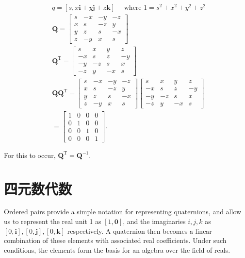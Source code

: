 $$
\begin{aligned}
& q=[s, x \mathbf{i}+y \mathbf{j}+z \mathbf{k}] \quad \text { where } 1=s^{2}+x^{2}+y^{2}+z^{2} \\
& \mathbf{Q}=\left[\begin{array}{cccc}s & -x & -y & -z \\x & s & -z & y \\y & z & s & -x \\z & -y & x & s\end{array}\right] \\
& \mathbf{Q}^{\mathrm{T}}=\left[\begin{array}{cccc}s & x & y & z \\-x & s & z & -y \\-y & -z & s & x \\-z & y & -x & s\end{array}\right] \\
& \mathbf{Q} \mathbf{Q}^{\mathrm{T}}=\left[\begin{array}{cccc}s & -x & -y & -z \\x & s & -z & y \\y & z & s & -x \\z & -y & x & s\end{array}\right]\left[\begin{array}{cccc}s & x & y & z \\-x & s & z & -y \\-y & -z & s & x \\-z & y & -x & s\end{array}\right] \\
& =\left[\begin{array}{llll}1 & 0 & 0 & 0 \\0 & 1 & 0 & 0 \\0 & 0 & 1 & 0 \\0 & 0 & 0 & 1\end{array}\right] \text {. }
\end{aligned}
$$

For this to occur, $\mathbf{Q}^{\mathrm{T}}=\mathbf{Q}^{-1}$.

\section{四元数代数}
Ordered pairs provide a simple notation for representing quaternions, and allow us to represent the real unit 1 as $[1, \mathbf{0}]$, and the imaginaries $i, j, k$ as $[0, \mathbf{i}],[0, \mathbf{j}],[0, \mathbf{k}]$ respectively. A quaternion then becomes a linear combination of these elements with associated real coefficients. Under such conditions, the elements form the basis for an algebra over the field of reals.

